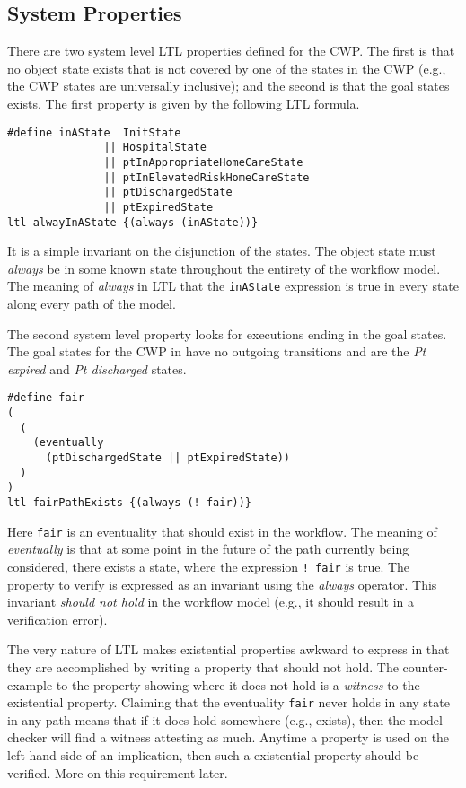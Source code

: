 \subsection{System Properties}
There are two system level LTL properties defined for the CWP. The first is that no object state exists that is not covered by one of the states in the CWP (e.g., the CWP states are universally inclusive); and the second is that the goal states exists. The first property is given by the following LTL formula.
%
{\small
\begin{lstlisting}[style=myPromela]
#define inAState  InitState
               || HospitalState
               || ptInAppropriateHomeCareState
               || ptInElevatedRiskHomeCareState
               || ptDischargedState
               || ptExpiredState
ltl alwayInAState {(always (inAState))}
\end{lstlisting}
}
%
\noindent It is a simple invariant on the disjunction of the states. The object state must \emph{always} be in some known state throughout the entirety of the workflow model. The meaning of \emph{always} in LTL that the \texttt{inAState} expression is true in every state along every path of the model.

The second system level property looks for executions ending in the goal states. The goal states for the CWP in  have no outgoing transitions and are the \emph{Pt expired} and \emph{Pt discharged} states.
%
{\small
\begin{lstlisting}[style=myPromela]
#define fair
(
  (
    (eventually 
      (ptDischargedState || ptExpiredState))
  )
)
ltl fairPathExists {(always (! fair))}
\end{lstlisting}
}
%
\noindent Here \texttt{fair} is an eventuality that should exist in the workflow. The meaning of \emph{eventually} is that at some point in the future of the path currently being considered, there exists a state, where the expression \texttt{! fair} is true. The property to verify is expressed as an invariant using the \emph{always} operator. This invariant \emph{should not hold} in the workflow model (e.g., it should result in a verification error). 

The very nature of LTL makes existential properties awkward to express in that they are accomplished by writing a property that should not hold. The counter-example to the property showing where it does not hold is a \emph{witness} to the existential property. Claiming that the eventuality \texttt{fair} never holds in any state in any path means that if it does hold somewhere (e.g., exists), then the model checker will find a witness attesting as much. Anytime a property is used on the left-hand side of an implication, then such a existential property should be verified. More on this requirement later.

